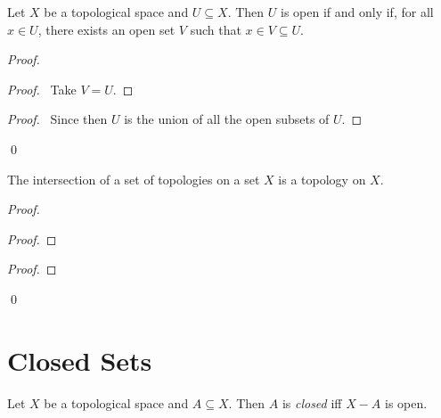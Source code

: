 \begin{prop}
\label{prop:open}
Let $X$ be a topological space and $U \subseteq X$. Then $U$ is open if and only if, for all $x \in U$, there exists an open set $V$ such that $x \in V \subseteq U$.
\end{prop}

\begin{proof}
\pf
{}
\begin{proof}
	\pf\ Take $V = U$.
\end{proof}
\begin{proof}
	\pf\ Since then $U$ is the union of all the open subsets of $U$.
\end{proof}
\qed
\end{proof}

\begin{prop}
The intersection of a set of topologies on a set $X$ is a topology on $X$.
\end{prop}

\begin{proof}
\pf
{}
\begin{proof}
\end{proof}
\begin{proof}
\end{proof}
\qed
\end{proof}

\section{Closed Sets}

\begin{df}
Let $X$ be a topological space and $A \subseteq X$. Then $A$ is \emph{closed} iff $X - A$ is open.
\end{df}

